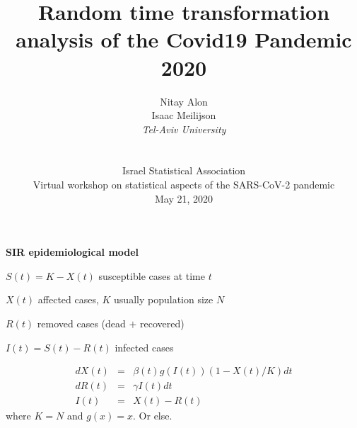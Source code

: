 \documentclass{article}
\begin{document}
\title {Random time transformation analysis of the Covid19 Pandemic 2020}

\author {
Nitay Alon
\\
Isaac Meilijson
\\
{\em Tel-Aviv University} \\
\\
\\
Israel Statistical Association \\
Virtual workshop on statistical aspects of the SARS-CoV-2 pandemic \\
May 21, 2020}



\date{}

\maketitle


\newpage



\huge


\begin{center} 
{\bf SIR epidemiological model}
\end{center} 

\bigskip

\noindent $S(t) = K - X(t)$ susceptible cases at time $t$ 

\noindent $X(t)$ affected cases, $K$ usually population size $N$

\noindent $R(t)$ removed cases (dead $+$ recovered)

\noindent $I(t)=S(t)-R(t)$ infected cases

\begin{eqnarray}
dX(t) & = & \beta(t) g(I(t)) (1 - X(t)/K) dt \nonumber \\
dR(t) & = & \gamma I(t) \nonumber dt \\
I(t) & = & X(t)-R(t) \nonumber
\end{eqnarray}
where $K=N$ and $g(x)=x$. Or else.
\end{document}
